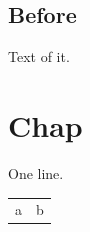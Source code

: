 \documentclass[a4paper]{memoir}
\begin{document}
\section*{Before}
Text of it.
\chapter*{Chap}
One line.
\begin{longtable}{ll}
\rule{0pt}{.8\textheight}a & b\\
\end{longtable}
\end{document}
